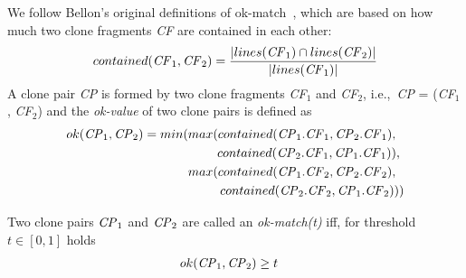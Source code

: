 \documentclass[10pt,journal,compsoc]{IEEEtran}
\newcommand{\squeezeup}{\vspace{-0.5mm}}
\begin{document}
We follow Bellon's original definitions of ok-match~\cite{Bellon2007}, which are based on how much two clone
fragments \textit{CF} are contained in each other:
\begin{displaymath}
contained(\textrm{\textit{CF}}_1, \textrm{\textit{CF}}_2) = \frac{|lines(\textrm{\textit{CF}}_1) \cap lines(\textrm{\textit{CF}}_2)|}{|lines(\textrm{\textit{CF}}_1)|}
\end{displaymath}
\noindent%
A clone pair \textit{CP} is formed by two clone fragments
\textit{CF$_1$} and \textit{CF$_2$}, i.e.,~\textit{CP} =
(\textit{CF$_1$}, \textit{CF$_2$})
and the \textit{ok-value} of two clone pairs is defined as
\begin{align*}
ok(\textrm{\textit{CP}}_1,\textrm{\textit{CP}}_2) = min(max(contained(\textrm{\textit{CP}}_1.\textrm{\textit{CF}}_1,\textrm{\textit{CP}}_2.\textrm{\textit{CF}}_1),~~ \\ contained(\textrm{\textit{CP}}_2.\textrm{\textit{CF}}_1,\textrm{\textit{CP}}_1.\textrm{\textit{CF}}_1)),~
\\ max(contained(\textrm{\textit{CP}}_1.\textrm{\textit{CF}}_2,\textrm{\textit{CP}}_2.\textrm{\textit{CF}}_2),~~ \\contained(\textrm{\textit{CP}}_2.\textrm{\textit{CF}}_2,\textrm{\textit{CP}}_1.\textrm{\textit{CF}}_2)))
\end{align*}

\noindent%
Two clone pairs $\textrm{\textit{CP}}_1$ and $\textrm{\textit{CP}}_2$
are called an \textit{ok-match(t)}  iff, for threshold $t \in [0,1]$ holds 
\begin{align*}
ok(\textrm{\textit{CP}}_1,\textrm{\textit{CP}}_2) & \geq t
\end{align*}
\end{document}
